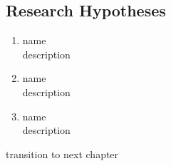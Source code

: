 \subsection{Research Hypotheses} %
\label{ssub:research_hypotheses}

\begin{enumerate}
    \item name \\
    description
    \item name \\
    description
    \item name \\
    description
\end{enumerate}



\vspace{2em}
transition to next chapter
